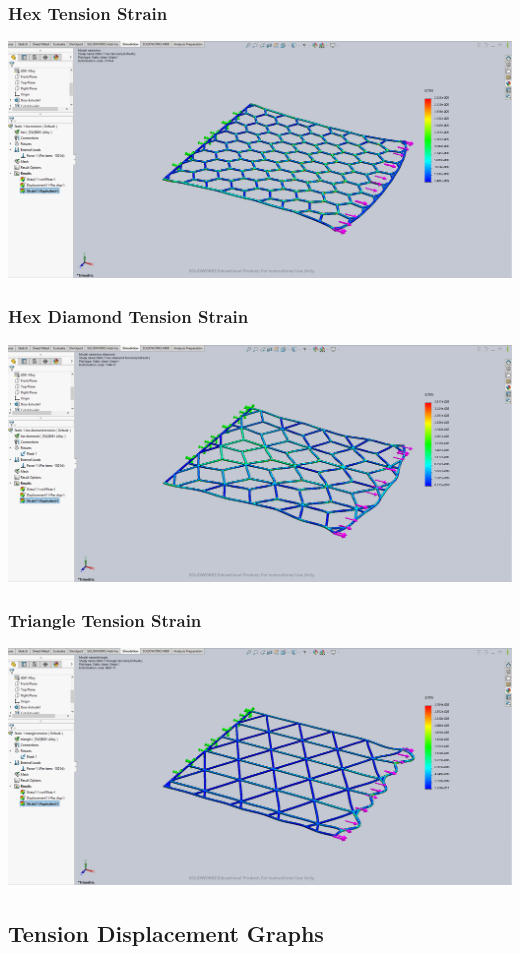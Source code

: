 \documentclass[12pt, letterpaper]{article}
\begin{document}
\begin{singlespace}
\subsubsection{Hex Tension Strain}
\label{ap:h-te-es}
\includegraphics[width=0.8\linewidth]{./graphs/tension/hex-tension-strain}

\subsubsection{Hex Diamond Tension Strain}
\label{ap:hd-te-es}
\includegraphics[width=0.8\linewidth]{./graphs/tension/hex-diamond-tension-strain}

\subsubsection{Triangle Tension Strain}
\label{ap:t-te-es}
\includegraphics[width=0.8\linewidth]{./graphs/tension/triangle-tension-strain}


\subsection{Tension Displacement Graphs}
\label{ap:te-d}


\end{singlespace}
\end{document}
